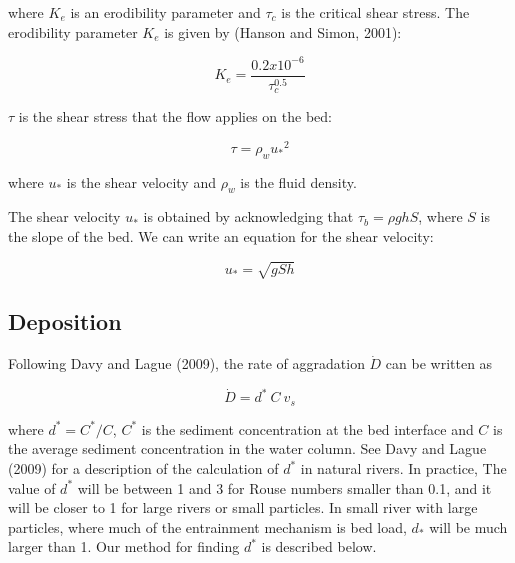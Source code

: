 \documentclass[11pt]{article}
\begin{document}
\noindent where $K_e$ is an erodibility parameter and ${\tau_c}$ is the critical shear stress. The erodibility parameter $K_e$ is given by (Hanson and Simon, 2001):
 
\begin{equation}
K_e = \frac{0.2 x 10^{-6}}{\tau_c^{0.5}}
\end{equation}

$\tau$ is the shear stress that the flow applies on the bed:

\begin{equation}
\tau = \rho_w {u_*}^2
\end{equation}

\noindent where $u_*$ is the shear velocity and $\rho_w$ is the fluid density.

The shear velocity $u_*$ is obtained by acknowledging that $\tau_b = \rho g h S$, where $S$ is the slope of the bed. We can write an equation for the shear velocity:

\begin{equation}
u_* = \sqrt{g S h}
\end{equation}


%
%
%

\subsection{Deposition}

Following Davy and Lague (2009), the rate of aggradation $\dot{D}$ can be written as

\begin{equation}
\dot{D} = d^* \: C \: v_s
\end{equation}

\noindent where $d^* = C^* / C$, $C^*$ is the sediment concentration at the bed interface and $C$ is the average sediment concentration in the water column. See Davy and Lague (2009) for a description of the calculation of $d^*$ in natural rivers. In practice, The value of $d^*$ will be between 1 and 3 for Rouse numbers smaller than 0.1, and it will be closer to 1 for large rivers or small particles. In small river with large particles, where much of the entrainment mechanism is bed load, $d_*$ will be much larger than 1. Our method for finding $d^*$ is described below.
\end{document}
